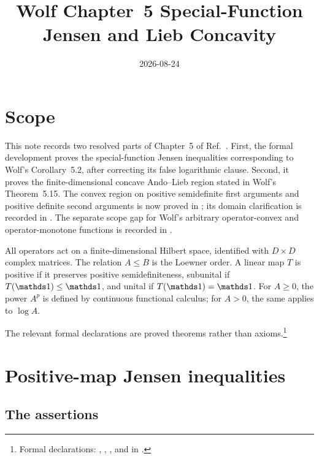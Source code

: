 \documentclass{article}
\title{Wolf Chapter~5 Special-Function Jensen and Lieb Concavity}
\author{}
\date{2026-08-24}
\begin{document}
\maketitle
{}

\section{Scope}

This note records two resolved parts of Chapter~5 of
Ref.~\cite{Wolf2012Quantum}. First, the formal development proves the
special-function Jensen inequalities corresponding to Wolf's Corollary~5.2,
after correcting its false logarithmic clause. Second, it proves the
finite-dimensional concave Ando--Lieb region stated in Wolf's Theorem~5.15.
The convex region on positive semidefinite first arguments and positive
definite second arguments is now proved in
; its domain clarification is recorded in
.
The separate scope gap for Wolf's arbitrary
operator-convex and operator-monotone functions is recorded in
.

All operators act on a finite-dimensional Hilbert space, identified with
$D\times D$ complex matrices. The relation $A\leq B$ is the Loewner order. A
linear map $T$ is positive if it preserves positive semidefiniteness,
subunital if $T(\Id)\leq\Id$, and unital if $T(\Id)=\Id$. For $A\geq 0$, the
power $A^p$ is defined by continuous functional calculus; for $A>0$, the same
applies to $\log A$.

The relevant formal declarations are proved theorems rather than
axioms.\footnote{Formal declarations:
,
,
, and
 in
.}

\section{Positive-map Jensen inequalities}

\subsection{The assertions}
\label{ssec:wolf_ch5_operator_jensen_lieb_assertions}
\end{document}
